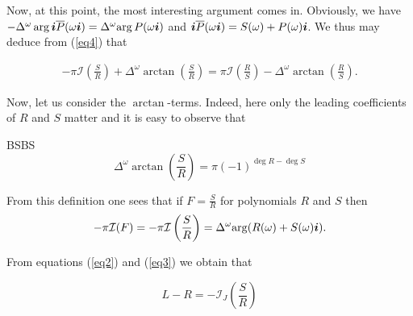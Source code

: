 \message{ !name(On The Routh-Hurwitz Theorem.tex)}\documentclass[10pt,a4paper]{article}
\begin{document}
Now, at this point, the most interesting argument comes in. Obviously, we have  $-\Delta^\omega\arg{\boldsymbol{i}\overline{P}(\omega\boldsymbol{i})}=\Delta^\omega{\arg{P(\omega\boldsymbol{i})}}$ and $\boldsymbol{i}\overline{P}(\omega\boldsymbol{i})=S(\omega)+P(\omega)\boldsymbol{i}$. We thus may deduce from (\ref{eq4}) that 

\begin{align}
-\pi\mathcal{I}\left(\frac{S}{R}\right)+\Delta^\omega{\arctan\left(\frac{S}{R}\right)} = \pi\mathcal{I}\left(\frac{R}{S}\right)-\Delta^\omega{\arctan\left(\frac{R}{S}\right)}\text{.}
\end{align}

Now, let us consider the $\arctan$-terms. Indeed, here only the leading coefficients of $R$ and $S$ matter and it is easy to observe that 

BSBS
\begin{equation}
\Delta^\omega{\arctan\left(\frac{S}{R}\right)}=\pi(-1)^{\deg{R}-\deg{S}}
\end{equation}


From this definition one sees  that if $F=\frac{S}{R}$ for polynomials $R$ and $S$ then
\begin{equation}
-\pi\mathcal{I}(F)=-\pi\mathcal{I}\left(\frac{S}{R}\right)=\Delta^\omega{\arg(R(\omega)+S(\omega)\boldsymbol{i})}\label{eq3}\text{.}
\end{equation}
 
From equations (\ref{eq2}) and (\ref{eq3}) we obtain that 

\begin{equation}
L-R = -\mathcal{I}_J\left(\frac{S}{R}\right)
\end{equation}
 
\end{document}
